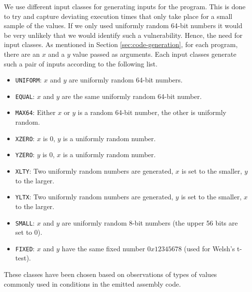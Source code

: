 We use different input classes for generating inputs for the program. 
This is done to try and capture deviating execution times that only take place for a small sample of the values.
If we only used uniformly random 64-bit numbers it would be very unlikely that we would identify such a vulnerability.
Hence, the need for input classes.
As mentioned in Section \ref{sec:code-generation}, for each program, there are an $x$ and a $y$ value passed as arguments. 
Each input classes generate such a pair of inputs according to the following list.
\begin{itemize}
    \setlength\itemsep{-0.6em}
    \item \texttt{UNIFORM}: $x$ and $y$ are uniformly random 64-bit numbers.
    \item \texttt{EQUAL}:  $x$ and $y$ are the same uniformly random 64-bit number.
    \item \texttt{MAX64}: Either $x$ or $y$ is a random 64-bit number, the other is uniformly random.
    \item \texttt{XZERO}: $x$ is 0, $y$ is a uniformly random number.
    \item \texttt{YZERO}: $y$ is 0, $x$ is a uniformly random number.
    \item \texttt{XLTY}: Two uniformly random numbers are generated, $x$ is set to the smaller, $y$ to the larger.
    \item \texttt{YLTX}: Two uniformly random numbers are generated, $y$ is set to the smaller, $x$ to the larger.
    \item \texttt{SMALL}: $x$ and $y$ are uniformly random 8-bit numbers (the upper 56 bits are set to 0).
    \item \texttt{FIXED}: $x$ and $y$ have the same fixed number $0x12345678$ (used for Welsh's t-test).
\end{itemize}
These classes have been chosen based on observations of types of values commonly used in conditions in the emitted assembly code.

